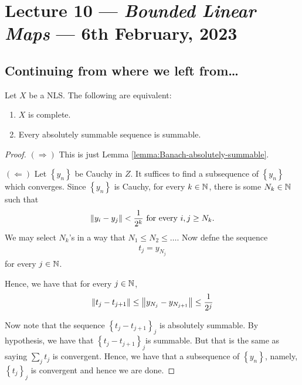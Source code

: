 \section{Lecture 10 --- \textit{Bounded Linear Maps} --- 6th February, 2023}
\horz
\subsection{Continuing from where we left from\ldots}


\begin{theorem}
    Let $X$ be a NLS. The following are equivalent:
    \begin{enumerate}
	\item $X$ is complete.
	\item Every absolutely summable sequence is summable.
    \end{enumerate}
    \label{thm:equivalent-thm-Banach}
\end{theorem}
\begin{proof}
    $\left( \Longrightarrow \right)$ This is just Lemma \ref{lemma:Banach-absolutely-summable}.

    $\left( \Longleftarrow \right)$ Let $\left\{ y_{n} \right\}$ be Cauchy in $Z$. It suffices to find a subsequence of $\left\{ y_{n} \right\}$ which converges. Since $\left\{ y_n \right\}$ is Cauchy, for every $k\in \mathbb N$, there is some $N_{k} \in \mathbb N$ such that 
    \begin{align*}
	\left\lVert y_{i} - y_{j} \right\rVert < \frac{1}{2^{k}} \text{ for every } i, j \ge N_{k}\text{.}
    \end{align*}
    We may select $N_{k}$'s in a way that $N_{1} \le N_{2} \le \ldots$. Now defne the sequence
    \begin{align*}
	t_{j} = y_{N_{j}}
    \end{align*}
    for every $j \in \mathbb N$.

    Hence, we have that for every $j \in \mathbb N$,
    \begin{align*}
    \left\lVert t_{j} - t_{j+1} \right\rVert \le \left\lVert y_{N_{j}} - y_{N_{j+1}} \right\rVert \le \frac{1}{2^{j}}
    \end{align*}
    
    Now note that the sequence $\left\{ t_{j} - t_{j+1} \right\}_{j}$ is absolutely summable. By hypothesis, we have that $\left\{ t_{j} - t_{j+1} \right\}_{j}$is summable. But that is the same as saying $\sum_{j} {t_j}$ is convergent. Hence, we have that a subsequence of $\left\{ y_{n} \right\}$, namely, $\left\{ t_{j} \right\}_{j}$ is convergent and hence we are done.
\end{proof}

